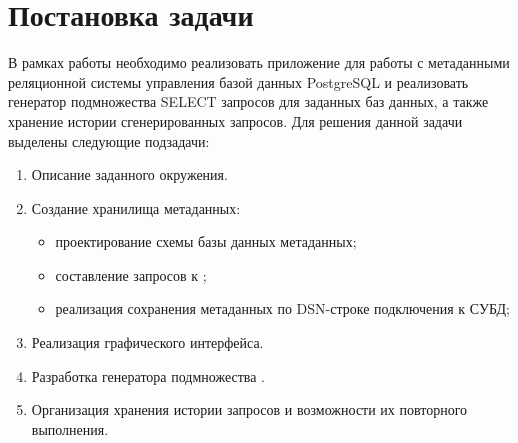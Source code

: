 \chapter*{Постановка задачи}
В рамках работы необходимо реализовать приложение для работы с метаданными реляционной системы управления базой данных PostgreSQL и реализовать генератор подмножества SELECT запросов для заданных баз данных, а также хранение истории сгенерированных запросов. Для решения данной задачи выделены следующие подзадачи:
\begin{enumerate}
	\item Описание заданного окружения.
	\item Создание хранилища метаданных:
	\begin{itemize}
		\item проектирование схемы базы данных метаданных;
		\item составление запросов к ;
		\item реализация сохранения метаданных по DSN-строке подключения к СУБД;
	\end{itemize}
	\item Реализация графического интерфейса.
	\item Разработка генератора подмножества .
	\item Организация хранения истории запросов и возможности их повторного выполнения.
\end{enumerate}